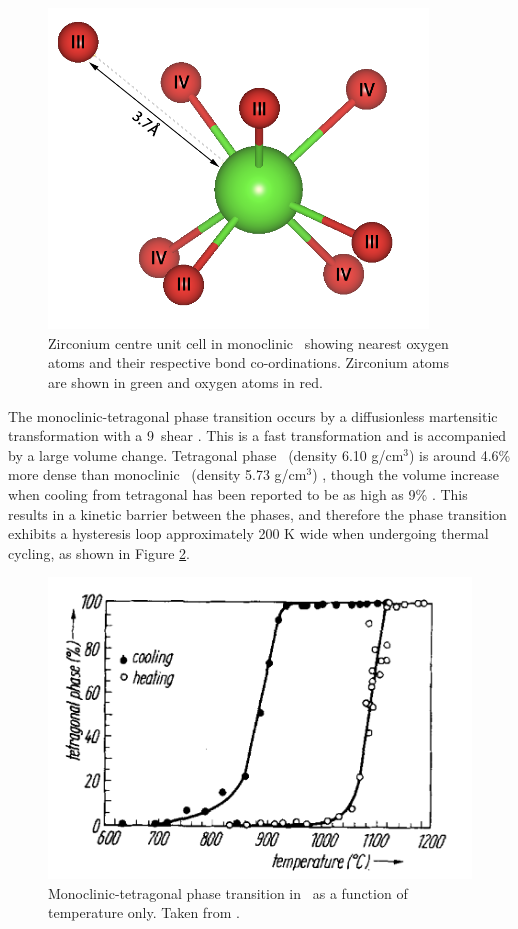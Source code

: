 \begin{figure}[ht] %
\centering
\includegraphics[height=8.5cm]{images/mono_zr_centre.png}
\caption{Zirconium centre unit cell in monoclinic \zirconia\ showing nearest oxygen atoms and their respective bond co-ordinations. Zirconium atoms are shown in green and oxygen atoms in red.}
\label{figure:monoschottky}
\end{figure}

The monoclinic-tetragonal phase transition occurs by a diffusionless martensitic transformation with a 9\textdegree\ shear \cite{Subbarao1974}. This is a fast transformation and is accompanied by a large volume change. Tetragonal phase \zirconia\ (density 6.10 g/cm$^{3}$) is around 4.6\% more dense than monoclinic \zirconia\ (density 5.73 g/cm$^{3}$) \cite{McCullough1959}, though the volume increase when cooling from tetragonal has been reported to be as high as 9\% \cite{Gupta1977}. This results in a kinetic barrier between the phases, and therefore the phase transition exhibits a hysteresis loop approximately 200 K wide when undergoing thermal cycling, as shown in Figure \ref{figure:hysteresis_monotet}.

\begin{figure}[ht] %
\centering
\includegraphics[width=12cm]{images/hysteresis_monotet.png}
\caption[Monoclinic-tetragonal phase transition in \zirconia\ as a function of temperature only.]{Monoclinic-tetragonal phase transition in \zirconia\ as a function of temperature only. Taken from \cite{WOLTEN1963}.}
\label{figure:hysteresis_monotet}
\end{figure}

